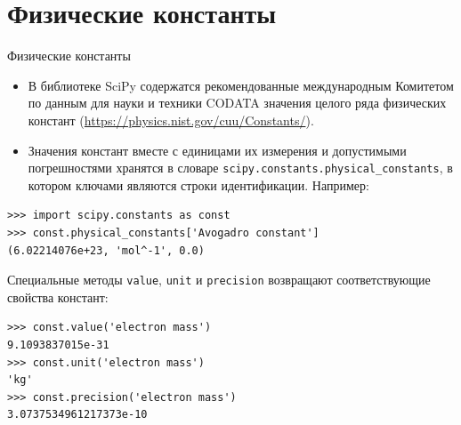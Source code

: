 \documentclass[aspectratio=169, mathserif]{beamer}	%
\begin{document}
\section{Физические константы}
\sectionframe


\begin{frame}[fragile, label=c]{Физические константы}
\scriptsize
\begin{itemize}
	\item В библиотеке SciPy содержатся рекомендованные международным Комитетом по данным для науки и техники CODATA значения целого ряда физических констант (\url{https://physics.nist.gov/cuu/Constants/}).
	\item Значения констант вместе с единицами их измерения и допустимыми погрешностями хранятся в словаре \texttt{scipy.constants.physical\_constants}, в котором ключами являются строки идентификации. Например:
\end{itemize}
\vfill
\begin{verbatim}
>>> import scipy.constants as const
>>> const.physical_constants['Avogadro constant']
(6.02214076e+23, 'mol^-1', 0.0)
\end{verbatim}
\vfill
Специальные методы \texttt{value}, \texttt{unit} и \texttt{precision} возвращают соответствующие свойства констант:
\vfill
\begin{verbatim}
>>> const.value('electron mass')
9.1093837015e-31
>>> const.unit('electron mass')
'kg'
>>> const.precision('electron mass')
3.0737534961217373e-10
\end{verbatim}
\vfill
\end{frame}
\end{document}
